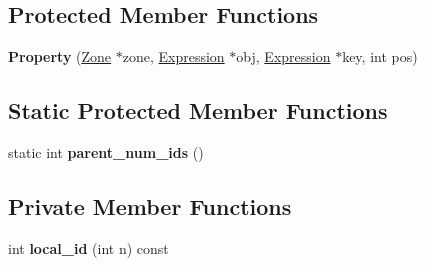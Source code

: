 \subsection*{Protected Member Functions}
\begin{DoxyCompactItemize}
\item 
{\bfseries Property} (\hyperlink{classv8_1_1internal_1_1_zone}{Zone} $\ast$zone, \hyperlink{classv8_1_1internal_1_1_expression}{Expression} $\ast$obj, \hyperlink{classv8_1_1internal_1_1_expression}{Expression} $\ast$key, int pos)\hypertarget{classv8_1_1internal_1_1_property_ad4b21f8534dc553a58c91b171212ec8f}{}\label{classv8_1_1internal_1_1_property_ad4b21f8534dc553a58c91b171212ec8f}

\end{DoxyCompactItemize}
\subsection*{Static Protected Member Functions}
\begin{DoxyCompactItemize}
\item 
static int {\bfseries parent\+\_\+num\+\_\+ids} ()\hypertarget{classv8_1_1internal_1_1_property_a54fc12ac46448edcfe954a125c5a2f22}{}\label{classv8_1_1internal_1_1_property_a54fc12ac46448edcfe954a125c5a2f22}

\end{DoxyCompactItemize}
\subsection*{Private Member Functions}
\begin{DoxyCompactItemize}
\item 
int {\bfseries local\+\_\+id} (int n) const \hypertarget{classv8_1_1internal_1_1_property_af4dbde4f62f1b6148fa98a2b22c38029}{}\label{classv8_1_1internal_1_1_property_af4dbde4f62f1b6148fa98a2b22c38029}

\end{DoxyCompactItemize}
